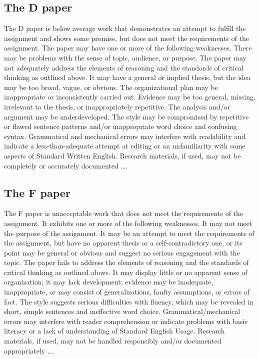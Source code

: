 \subsection{The D paper}

The D paper is below average work that demonstrates an attempt to fulfill the assignment and shows some promise, but does not meet the requirements of the assignment. The paper may have one or more of the following weaknesses. There may be problems with the sense of topic, audience, or purpose. The paper may not adequately address the elements of reasoning and the standards of critical thinking as outlined above. It may have a general or implied thesis, but the idea may be too broad, vague, or obvious. The organizational plan may be inappropriate or inconsistently carried out. Evidence may be too general, missing, irrelevant to the thesis, or inappropriately repetitive. The analysis and/or argument may be underdeveloped. The style may be compromised by repetitive or flawed sentence patterns and/or inappropriate word choice and confusing syntax. Grammatical and mechanical errors may interfere with readability and indicate a less-than-adequate attempt at editing or an unfamiliarity with some aspects of Standard Written English. Research materials, if used, may not be completely or accurately documented \dots.

\subsection{The F paper}

The F paper is unacceptable work that does not meet the requirements of the assignment. It exhibits one or more of the following weaknesses. It may not meet the purpose of the assignment. It may be an attempt to meet the requirements of the assignment, but have no apparent thesis or a self-contradictory one, or its point may be general or obvious and suggest no serious engagement with the topic. The paper fails to address the elements of reasoning and the standards of critical thinking as outlined above. It may display little or no apparent sense of organization; it may lack development; evidence may be inadequate, inappropriate, or may consist of generalizations, faulty assumptions, or errors of fact. The style suggests serious difficulties with fluency, which may be revealed in short, simple sentences and ineffective word choice. Grammatical/mechanical errors may interfere with reader comprehension or indicate problems with basic literacy or a lack of understanding of Standard English Usage. Research materials, if used, may not be handled responsibly and/or documented appropriately \dots.
